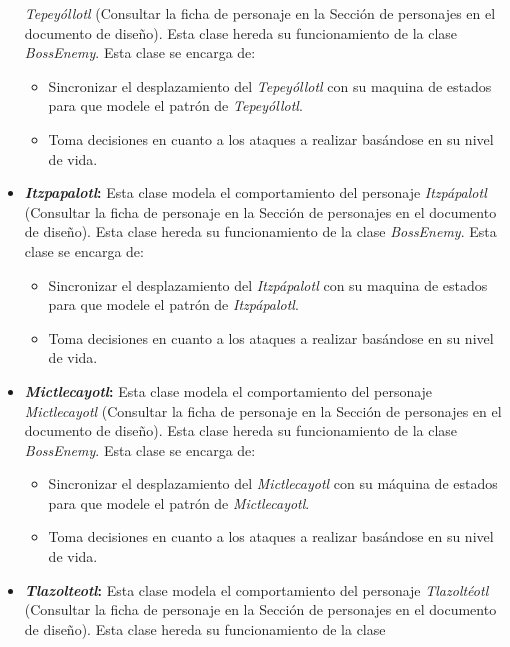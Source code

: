 \begin{itemize}
			\textit{Tepeyóllotl} (Consultar la ficha de personaje en la Sección de personajes en 
			el documento de diseño). Esta clase hereda su funcionamiento de la clase 
			\textit{BossEnemy}. Esta clase se encarga de:  
			\begin{itemize}
				\item Sincronizar el desplazamiento del \textit{Tepeyóllotl} con su maquina 
				de estados para que modele el patrón de \textit{Tepeyóllotl}.
				\item Toma decisiones en cuanto a los ataques a realizar basándose en su 
				nivel de vida.
			\end{itemize}
			\item \textbf{\textit{Itzpapalotl}:} Esta clase modela el comportamiento del personaje 
			\textit{Itzpápalotl} (Consultar la ficha de personaje en la Sección de personajes en 
			el documento de diseño). Esta clase hereda su funcionamiento de la clase 
			\textit{BossEnemy}. Esta clase se encarga de:  
			\begin{itemize}
				\item Sincronizar el desplazamiento del \textit{Itzpápalotl} con su maquina 
				de estados para que modele el patrón de \textit{Itzpápalotl}.
				\item Toma decisiones en cuanto a los ataques a realizar basándose en su 
				nivel de vida.
			\end{itemize}
			\item \textbf{\textit{Mictlecayotl}:} Esta clase modela el comportamiento del personaje 
			\textit{Mictlecayotl} (Consultar la ficha de personaje en la Sección de personajes en 
			el documento de diseño). Esta clase hereda su funcionamiento de la clase 
			\textit{BossEnemy}. Esta clase se encarga de:  
			\begin{itemize}
				\item Sincronizar el desplazamiento del \textit{Mictlecayotl} con su máquina 
				de estados para que modele el patrón de \textit{Mictlecayotl}.
				\item Toma decisiones en cuanto a los ataques a realizar basándose en su 
				nivel de vida.
			\end{itemize}
			\item \textbf{\textit{Tlazolteotl}:} Esta clase modela el comportamiento del personaje 
			\textit{Tlazoltéotl} (Consultar la ficha de personaje en la Sección de personajes en 
			el documento de diseño). Esta clase hereda su funcionamiento de la clase 

\end{itemize}
